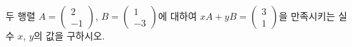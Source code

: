두 행렬 $A=\begin{pmatrix} 2 \\ -1 \end{pmatrix}$, $B=\begin{pmatrix} 1 \\ -3 \end{pmatrix}$에 대하여 $xA+yB=\begin{pmatrix} 3 \\ 1 \end{pmatrix}$을 만족시키는 실수 $x$, $y$의 값을 구하시오.
